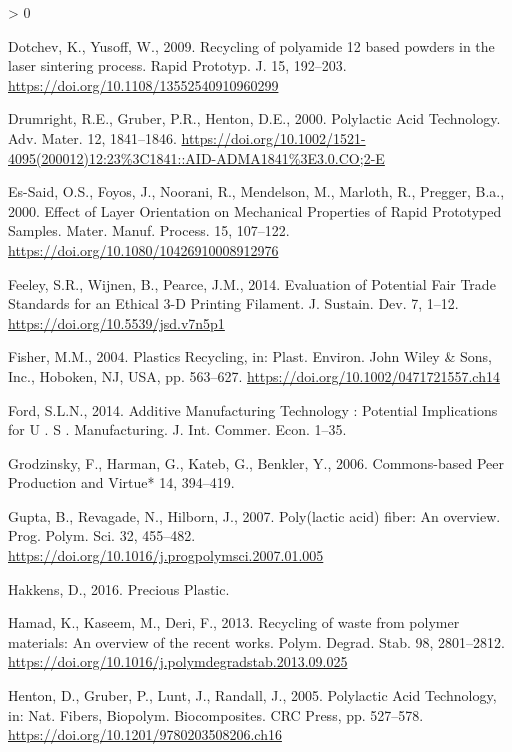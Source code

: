 \documentclass[
]{article}
\newlength{\cslhangindent}
\newenvironment{CSLReferences}[2] %
 {%
  \setlength{\parindent}{0pt}
  \ifodd #1 \everypar{\setlength{\hangindent}{\cslhangindent}}\ignorespaces\fi
  \ifnum #2 > 0
  \setlength{\parskip}{#2\baselineskip}
  \fi
 }%
 {}
\begin{document}
\begin{CSLReferences}{1}{0}
\leavevmode\hypertarget{ref-Dotchev2009}{}%
Dotchev, K., Yusoff, W., 2009. {Recycling of polyamide 12 based powders in the laser sintering process}. Rapid Prototyp. J. 15, 192--203. \url{https://doi.org/10.1108/13552540910960299}

\leavevmode\hypertarget{ref-Drumright2000}{}%
Drumright, R.E., Gruber, P.R., Henton, D.E., 2000. {Polylactic Acid Technology}. Adv. Mater. 12, 1841--1846. \url{https://doi.org/10.1002/1521-4095(200012)12:23\%3C1841::AID-ADMA1841\%3E3.0.CO;2-E}

\leavevmode\hypertarget{ref-Es-Said2000}{}%
Es-Said, O.S., Foyos, J., Noorani, R., Mendelson, M., Marloth, R., Pregger, B.a., 2000. {Effect of Layer Orientation on Mechanical Properties of Rapid Prototyped Samples}. Mater. Manuf. Process. 15, 107--122. \url{https://doi.org/10.1080/10426910008912976}

\leavevmode\hypertarget{ref-Feeley2014}{}%
Feeley, S.R., Wijnen, B., Pearce, J.M., 2014. {Evaluation of Potential Fair Trade Standards for an Ethical 3-D Printing Filament}. J. Sustain. Dev. 7, 1--12. \url{https://doi.org/10.5539/jsd.v7n5p1}

\leavevmode\hypertarget{ref-Fisher2004}{}%
Fisher, M.M., 2004. {Plastics Recycling}, in: Plast. Environ. John Wiley {\&} Sons, Inc., Hoboken, NJ, USA, pp. 563--627. \url{https://doi.org/10.1002/0471721557.ch14}

\leavevmode\hypertarget{ref-Ford2014}{}%
Ford, S.L.N., 2014. {Additive Manufacturing Technology : Potential Implications for U . S . Manufacturing}. J. Int. Commer. Econ. 1--35.

\leavevmode\hypertarget{ref-Grodzinsky2006}{}%
Grodzinsky, F., Harman, G., Kateb, G., Benkler, Y., 2006. {Commons-based Peer Production and Virtue*} 14, 394--419.

\leavevmode\hypertarget{ref-Gupta2007}{}%
Gupta, B., Revagade, N., Hilborn, J., 2007. {Poly(lactic acid) fiber: An overview}. Prog. Polym. Sci. 32, 455--482. \url{https://doi.org/10.1016/j.progpolymsci.2007.01.005}

\leavevmode\hypertarget{ref-Hakkens2016}{}%
Hakkens, D., 2016. {Precious Plastic}.

\leavevmode\hypertarget{ref-Hamad2013}{}%
Hamad, K., Kaseem, M., Deri, F., 2013. {Recycling of waste from polymer materials: An overview of the recent works}. Polym. Degrad. Stab. 98, 2801--2812. \url{https://doi.org/10.1016/j.polymdegradstab.2013.09.025}

\leavevmode\hypertarget{ref-Henton2005}{}%
Henton, D., Gruber, P., Lunt, J., Randall, J., 2005. {Polylactic Acid Technology}, in: Nat. Fibers, Biopolym. Biocomposites. CRC Press, pp. 527--578. \url{https://doi.org/10.1201/9780203508206.ch16}


\end{CSLReferences}
\end{document}
